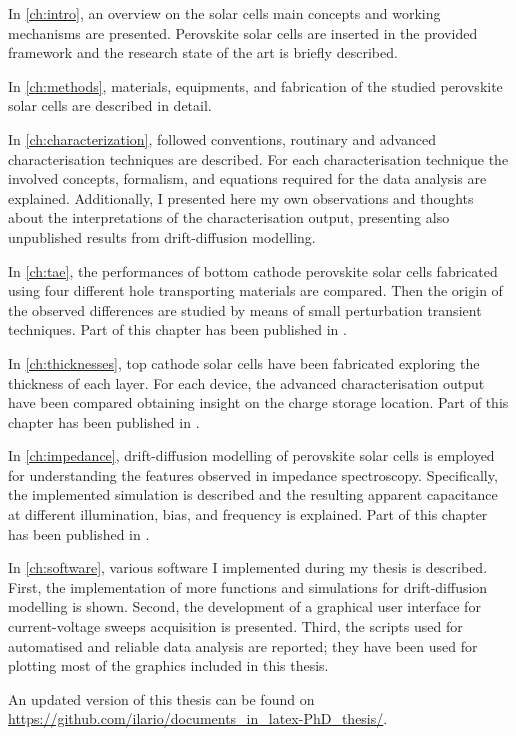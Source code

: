 
\hspace{\parindent}In \cref{ch:intro}, an overview on the solar cells main concepts and working mechanisms are presented.
Perovskite solar cells are inserted in the provided framework and the research state of the art is briefly described.

In \cref{ch:methods}, materials, equipments, and fabrication of the studied perovskite solar cells are described in detail.

In \cref{ch:characterization}, followed conventions, routinary and advanced characterisation techniques are described.
For each characterisation technique the involved concepts, formalism, and equations required for the data analysis are explained.
Additionally, I presented here my own observations and thoughts about the interpretations of the characterisation output, presenting also unpublished results from drift\hyp{}diffusion modelling.

In \cref{ch:tae}, the performances of bottom cathode perovskite solar cells fabricated using four different hole transporting materials are compared.
Then the origin of the observed differences are studied by means of small perturbation transient techniques.
Part of this chapter has been published in \cite{Gelmetti2019}.

In \cref{ch:thicknesses}, top cathode solar cells have been fabricated exploring the thickness of each layer.
For each device, the advanced characterisation output have been compared obtaining insight on the charge storage location.
Part of this chapter has been published in \cite{Gelmetti2017}.

In \cref{ch:impedance}, drift\hyp{}diffusion modelling of perovskite solar cells is employed for understanding the features observed in impedance spectroscopy.
Specifically, the implemented simulation is described and the resulting apparent capacitance at different illumination, bias, and frequency is explained.
Part of this chapter has been published in \cite{Moia2019}.

In \cref{ch:software}, various software I implemented during my thesis is described.
First, the implementation of more functions and simulations for drift\hyp{}diffusion modelling is shown.
Second, the development of a graphical user interface for current\hyp{}voltage sweeps acquisition is presented.
Third, the scripts used for automatised and reliable data analysis are reported; they have been used for plotting most of the graphics included in this thesis.

An updated version of this thesis can be found on \url{https://github.com/ilario/documents_in_latex-PhD_thesis/}.